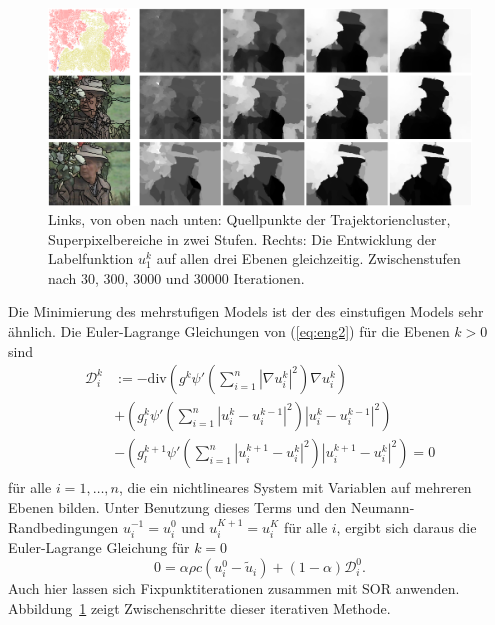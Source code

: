 \begin{figure}[tb]\centering\includegraphics[width=7.0in]{images/evo_labels.png}
  \caption{Links, von oben nach unten: Quellpunkte der Trajektoriencluster, Superpixelbereiche in zwei Stufen.
Rechts: Die Entwicklung der Labelfunktion $u_1^k$ auf allen drei Ebenen gleichzeitig. Zwischenstufen nach 30, 300, 3000 und 30000 Iterationen.}
  \label{fig:evo}
\end{figure}


Die Minimierung des mehrstufigen Models ist der des einstufigen Models sehr ähnlich.
Die Euler-Lagrange Gleichungen von (\ref{eq:eng2}) für die Ebenen $k>0$ sind
\begin{equation}
\begin{split}
    \mathcal{D}_i^k &:= -\mathrm{div} \left( g^k \psi' \left( \sum \limits_{i=1}^n \left| \nabla u_i^k \right|^2 \right) \nabla u_i^k \right) \\
    & + \left( g_l^k \psi' \left( \sum \limits_{i=1}^n \left| u_i^k - u_i^{k-1} \right|^2 \right) \left| u_i^k - u_i^{k-1} \right|^2 \right)\\
    & - \left( g_l^{k+1} \psi' \left( \sum \limits_{i=1}^n \left| u_i^{k+1} - u_i^{k} \right|^2 \right) \left| u_i^{k+1} - u_i^{k} \right|^2 \right) = 0\\
\end{split}
\end{equation}
für alle $i=1,\dotsc,n$, die ein nichtlineares System mit Variablen auf mehreren Ebenen bilden. Unter Benutzung dieses Terms und den
Neumann-Randbedingungen $u_i^{-1} = u_i^0$ und $u_i^{K+1} = u_i^K$ für alle $i$, ergibt sich daraus die Euler-Lagrange Gleichung für $k=0$
\begin{equation}
    0 = \alpha \rho c (u_i^0 - \tilde u_i) + (1- \alpha) \mathcal{D}_i^0.
\end{equation}
Auch hier lassen sich Fixpunktiterationen zusammen mit SOR anwenden. Abbildung~\ref{fig:evo} zeigt Zwischenschritte dieser iterativen Methode.

